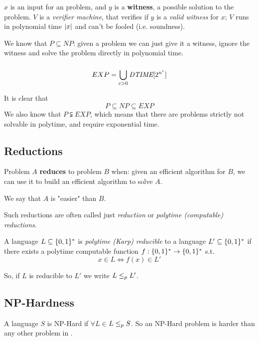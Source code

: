         $x$ is an input for an \NP{} problem, and $y$ is a \textbf{witness}\label{witness}, a possible solution to the problem.
        $V$ is a \textit{verifier machine}, that verifies if $y$ is a \textit{valid witness} for $x$; $V$ runs in polynomial time \wrt $\vert x \vert$ and can't be fooled (i.e. soundness).

    We know that $P \subseteq NP$: given a \PP{} problem we can just give it a witness, ignore the witness and solve the problem directly in polynomial time.

    \subsubsection{\EXP}\label{subsubsec:exp}
        \begin{definition}[\EXP]\label{def:exp}
            \[ EXP = \bigcup_{c > 0} \textit{DTIME}[2^{n^c}] \]
        \end{definition}

        It is clear that
        \[ P \subseteq NP \subseteq EXP \]
        We also know that $P \subsetneqq EXP$, which means that there are problems strictly not solvable in polytime, and require exponential time.

    
\subsection{Reductions}\label{sec:reductions}

    Problem $A$ \textbf{reduces} to problem $B$ when: given an efficient algorithm for $B$, we can use it to build an efficient algorithm to solve $A$.
    
    We say that $A$ is "easier" than $B$.

    \begin{definition}\label{def:karp_reduction}
        Such reductions are often called just \textit{reduction} or \textit{polytime (computable) reductions}.

        A language $L \subseteq \{ 0,1 \}^*$ is \textit{polytime (Karp) reducible} to a language $L' \subseteq \{ 0,1 \}^*$ if there exists a polytime computable function $f : \{ 0,1 \}^* \rightarrow \{ 0,1 \}^*$ s.t.
        \[ x \in L \Longleftrightarrow f(x) \in L' \]

        So, if $L$ is reducible to $L'$ we write $L \leq_p L'$.
    \end{definition}


\subsection{NP-Hardness}\label{subsec:np_hardness}
    A language $S$ is NP-Hard if $\forall L \in$\NP $L \leq_p S$.
    So an NP-Hard problem is harder than any other problem in \NP.

